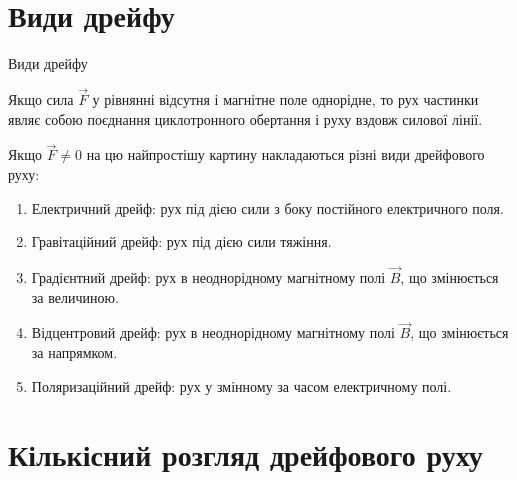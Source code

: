 \documentclass[]{beamer}
\begin{document}
\section{Види дрейфу}





\begin{frame}{Види дрейфу}{}
	\begin{block}{}
		Якщо сила $\vec{F}$ у рівнянні відсутня і магнітне
		поле однорідне, то рух частинки являє собою поєднання циклотронного обертання і руху вздовж силової лінії.
	\end{block}
	Якщо  $\vec{F} \neq 0$ на цю найпростішу картину накладаються різні види дрейфового руху:
	\begin{enumerate}
		\item \alert{Електричний дрейф}: рух під дією сили з боку постійного електричного поля.
		\item \alert{Гравітаційний дрейф}: рух під дією сили тяжіння.
		\item \alert{Градієнтний дрейф}: рух в неоднорідному магнітному полі $\vec{B}$, що змінюється за величиною.
		\item \alert{Відцентровий дрейф}:  рух в неоднорідному магнітному полі $\vec{B}$, що змінюється за напрямком.
		\item \alert{Поляризаційний дрейф}: рух у змінному за часом електричному полі.
	\end{enumerate}
\end{frame}




\section{Кількісний розгляд дрейфового руху}
\end{document}

